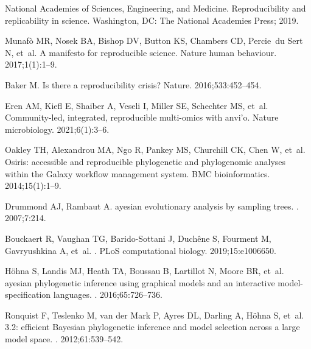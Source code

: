 \documentclass[10pt,letterpaper,table]{article}
\theoremstyle{definition}
\begin{document}
\nolinenumbers

\begin{thebibliography}{10}

{National Academies of Sciences, Engineering, and Medicine}.
\newblock Reproducibility and replicability in science.
\newblock Washington, {DC}: {The National Academies Press}; 2019.

Munaf{\`o} MR, Nosek BA, Bishop DV, Button KS, Chambers CD, Percie~du Sert N,
  et~al.
\newblock A manifesto for reproducible science.
\newblock Nature human behaviour. 2017;1(1):1--9.

Baker M.
\newblock Is there a reproducibility crisis?
\newblock Nature. 2016;533:452--454.

Eren AM, Kiefl E, Shaiber A, Veseli I, Miller SE, Schechter MS, et~al.
\newblock Community-led, integrated, reproducible multi-omics with anvi'o.
\newblock Nature microbiology. 2021;6(1):3--6.

Oakley TH, Alexandrou MA, Ngo R, Pankey MS, Churchill CK, Chen W, et~al.
\newblock Osiris: accessible and reproducible phylogenetic and phylogenomic
  analyses within the Galaxy workflow management system.
\newblock BMC bioinformatics. 2014;15(1):1--9.

Drummond AJ, Rambaut A.
ayesian evolutionary analysis by sampling trees.
. 2007;7:214.

Bouckaert R, Vaughan TG, Barido-Sottani J, Duch\^{e}ne S, Fourment M,
  Gavryushkina A, et~al.
.
\newblock PLoS computational biology. 2019;15:e1006650.

H\"{o}hna S, Landis MJ, Heath TA, Boussau B, Lartillot N, Moore BR, et~al.
ayesian phylogenetic inference using graphical models
  and an interactive model-specification languages.
. 2016;65:726--736.

Ronquist F, Teslenko M, {van der Mark} P, Ayres DL, Darling A, H\"{o}hna S,
  et~al.
 3.2: efficient {B}ayesian phylogenetic inference and model
  selection across a large model space.
. 2012;61:539--542.


\end{thebibliography}
\end{document}
